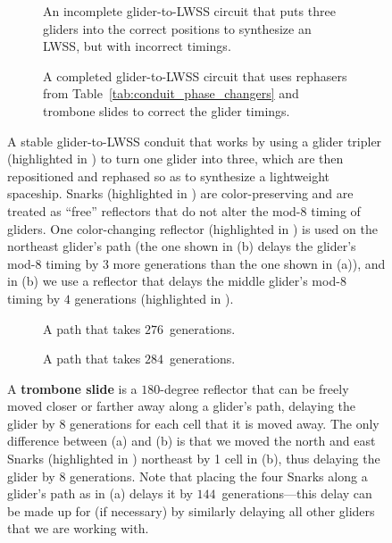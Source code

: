 \begin{figure}[!htb]
	\centering
	\begin{subfigure}{.445\textwidth}
		\centering
		\caption{An incomplete glider-to-LWSS circuit that puts three gliders into the correct positions to synthesize an LWSS, but with incorrect timings.}\label{fig:glider_to_lwss_incomplete}
	\end{subfigure} \hfill %
	\begin{subfigure}{.52\textwidth}
		\centering
		\caption{A completed glider-to-LWSS circuit that uses rephasers from Table~\ref{tab:conduit_phase_changers} and trombone slides to correct the glider timings.}
		\label{fig:glider_to_lwss_big}
	\end{subfigure}
	\caption{A stable glider-to-LWSS conduit that works by using a glider tripler (highlighted in ) to turn one glider into three, which are then repositioned and rephased so as to synthesize a lightweight spaceship. Snarks (highlighted in ) are color-preserving and are treated as ``free'' reflectors that do not alter the mod-$8$ timing of gliders. One color-changing reflector (highlighted in ) is used on the northeast glider's path (the one shown in (b) delays the glider's mod-$8$ timing by $3$ more generations than the one shown in (a)), and in (b) we use a reflector that delays the middle glider's mod-$8$ timing by $4$ generations (highlighted in ).}\label{fig:glider_to_lwss_both}
\end{figure}

\begin{figure}[!htb]
	\centering
	\begin{subfigure}{.485\textwidth}
		\centering
		\caption{A path that takes $276$~generations.}\label{fig:trombone_slide_276}
	\end{subfigure} \hfill %
	\begin{subfigure}{.485\textwidth}
		\centering
		\caption{A path that takes $284$~generations.}
		\label{fig:trombone_slide_284}
	\end{subfigure}
	\caption{A \textbf{trombone slide} is a $180$-degree reflector that can be freely moved closer or farther away along a glider's path, delaying the glider by $8$ generations for each cell that it is moved away. The only difference between (a) and (b) is that we moved the north and east Snarks (highlighted in ) northeast by 1 cell in (b), thus delaying the glider by $8$ generations. Note that placing the four Snarks along a glider's path as in (a) delays it by $144$~generations---this delay can be made up for (if necessary) by similarly delaying all other gliders that we are working with.}\label{fig:trombone_slide}
\end{figure}


